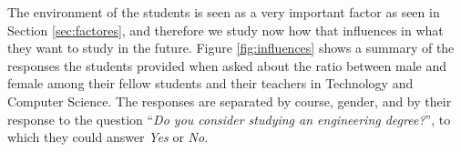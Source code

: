 \documentclass[journal,transmag]{IEEEtran}
\begin{document}
%

The environment of the students is seen as a very important factor as seen in Section \ref{sec:factores}, and therefore we study now how that influences in what they want to study in the future. Figure \ref{fig:influences} shows a summary of the responses the students provided when asked about the ratio between male and female among their fellow students and their teachers in Technology and Computer Science. The responses are separated by course, gender, and by their response to the question ``\textit{Do you consider studying an engineering degree?}'', to which they could answer \textit{Yes} or \textit{No}.
\end{document}
